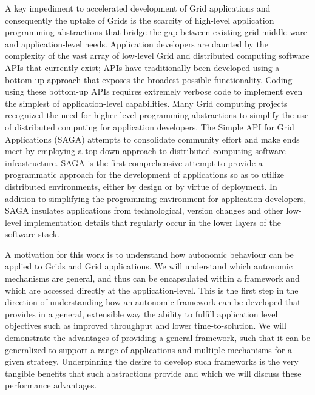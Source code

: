 \documentclass{sig-alternate}
\newcommand{\jhanote}[1]{ {\textcolor{red} { ***Jha: #1 }}}
\newcommand{\jhanote}[1]{}
\begin{document}
A key impediment to accelerated development of Grid applications and
consequently the uptake of Grids is the scarcity of high-level
application programming abstractions that bridge the gap between
existing grid middle-ware and application-level needs.  Application
developers are daunted by the complexity of the vast array of
low-level Grid and distributed computing software APIs that currently
exist; APIs have traditionally been developed using a bottom-up
approach that exposes the broadest possible functionality.  Coding
using these bottom-up APIs requires extremely verbose code to
implement even the simplest of application-level capabilities.  Many
Grid computing projects~\cite{gat, cog, realitygrid} recognized the
need for higher-level programming abstractions to simplify the use of
distributed computing for application developers.  The Simple API for
Grid Applications (SAGA) attempts to consolidate community effort and
make ends meet by employing a top-down approach to distributed
computing software infrastructure.  SAGA is the first comprehensive
attempt to provide a programmatic approach for the development of
applications so as to utilize distributed environments, either by
design or by virtue of deployment.  In addition to simplifying the
programming environment for application developers, SAGA insulates
applications from technological, version changes and other low-level
implementation details that regularly occur in the lower layers of the
software stack.

A motivation for this work is to understand how autonomic behaviour
can be applied to Grids and Grid applications. We will understand
which autonomic mechanisms are general, and thus can be encapsulated
within a framework and which are accessed directly at the
application-level. This is the first step in the direction of
understanding how an autonomic framework can be developed that
provides in a general, extensible way the ability to fulfill
application level objectives such as improved throughput and lower
time-to-solution. We will demonstrate the advantages of providing a
general framework, such that it can be generalized to support a range
of applications and multiple mechanisms for a given
strategy. Underpinning the desire to develop such frameworks is the
very tangible benefits that such abstractions provide and which we
will discuss these performance advantages.

\end{document}
